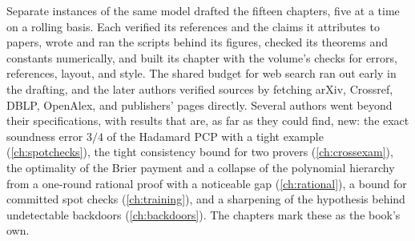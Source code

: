 Separate instances of the same model drafted the fifteen chapters, five at a time on a rolling basis. Each verified its references and the claims it attributes to papers, wrote and ran the scripts behind its figures, checked its theorems and constants numerically, and built its chapter with the volume's checks for errors, references, layout, and style. The shared budget for web search ran out early in the drafting, and the later authors verified sources by fetching arXiv, Crossref, DBLP, OpenAlex, and publishers' pages directly. Several authors went beyond their specifications, with results that are, as far as they could find, new: the exact soundness error $3/4$ of the Hadamard PCP with a tight example (\cref{ch:spotchecks}), the tight consistency bound for two provers (\cref{ch:crossexam}), the optimality of the Brier payment and a collapse of the polynomial hierarchy from a one-round rational proof with a noticeable gap (\cref{ch:rational}), a bound for committed spot checks (\cref{ch:training}), and a sharpening of the hypothesis behind undetectable backdoors (\cref{ch:backdoors}). The chapters mark these as the book's own.

